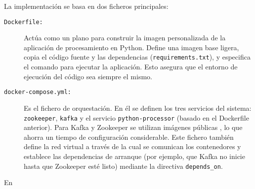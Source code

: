 La implementación se basa en dos ficheros principales:
\begin{description}
    \item[\texttt{Dockerfile:}] Actúa como un plano para construir la imagen personalizada de la aplicación de procesamiento en Python. Define una imagen base ligera, copia el código fuente y las dependencias (\texttt{requirements.txt}), y especifica el comando para ejecutar la aplicación. Esto asegura que el entorno de ejecución del código sea siempre el mismo.
    \item[\texttt{docker-compose.yml:}] Es el fichero de orquestación. En él se definen los tres servicios del sistema: \texttt{zookeeper}, \texttt{kafka} y el servicio \texttt{python-processor} (basado en el Dockerfile anterior). Para Kafka y Zookeeper se utilizan imágenes públicas \cite{confluent_docker}, lo que ahorra un tiempo de configuración considerable. Este fichero también define la red virtual a través de la cual se comunican los contenedores y establece las dependencias de arranque (por ejemplo, que Kafka no inicie hasta que Zookeeper esté listo) mediante la directiva \texttt{depends\_on}.
\end{description}

En
